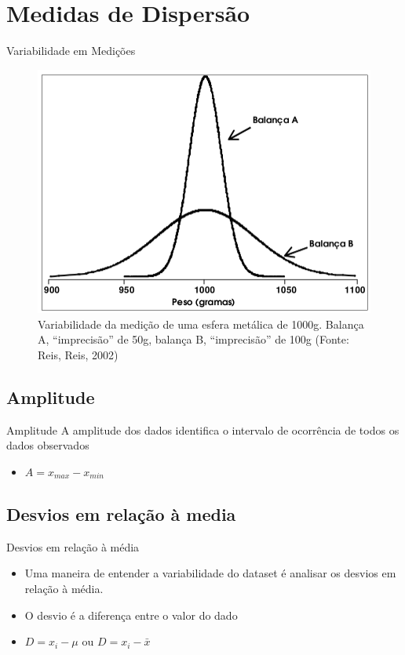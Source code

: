 \documentclass{beamer}
\begin{document}
\section{Medidas de Dispersão}

\begin{frame}{Variabilidade em Medições}
  \begin{figure}
    \includegraphics[height=0.7\textheight]{variancia}
    \caption{Variabilidade da medição de uma esfera metálica de
      1000g. Balança A, ``imprecisão'' de 50g, balança B,
      ``imprecisão'' de 100g (Fonte: Reis, Reis, 2002)}
  \end{figure}
\end{frame}
\subsection{Amplitude}
\begin{frame}{Amplitude}
  A amplitude dos dados identifica o intervalo de ocorrência de todos
  os dados observados
  \begin{itemize}
  \item $A = x_{max} - x_{min}$
  \end{itemize}
\end{frame}

\subsection{Desvios em relação à media}
\begin{frame}{Desvios em relação à média}
  \begin{itemize}
  \item Uma maneira de entender a variabilidade do dataset é analisar
    os desvios em relação à média.
  \item O desvio é a diferença entre o valor do dado
  \item $D = x_i - \mu$ ou $D= x_i - \bar{x}$
  \end{itemize}
\end{frame}
\end{document}
